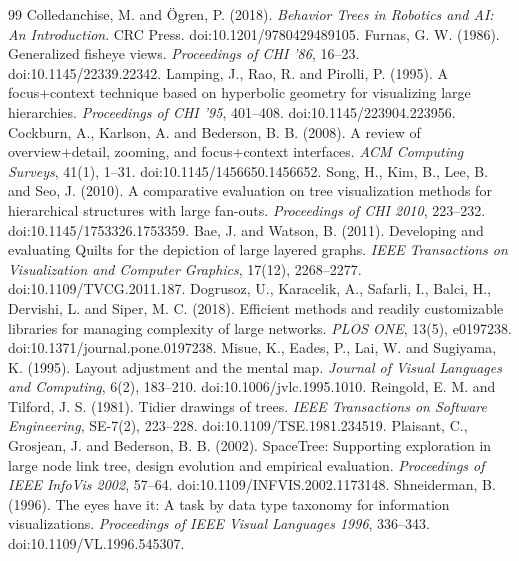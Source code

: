 \begin{thebibliography}{99}
 Colledanchise, M. and Ögren, P. (2018). \emph{Behavior Trees in Robotics and AI: An Introduction}. CRC Press. doi:10.1201/9780429489105.
 Furnas, G. W. (1986). Generalized fisheye views. \emph{Proceedings of CHI '86}, 16--23. doi:10.1145/22339.22342.
 Lamping, J., Rao, R. and Pirolli, P. (1995). A focus+context technique based on hyperbolic geometry for visualizing large hierarchies. \emph{Proceedings of CHI '95}, 401--408. doi:10.1145/223904.223956.
 Cockburn, A., Karlson, A. and Bederson, B. B. (2008). A review of overview+detail, zooming, and focus+context interfaces. \emph{ACM Computing Surveys}, 41(1), 1--31. doi:10.1145/1456650.1456652.
 Song, H., Kim, B., Lee, B. and Seo, J. (2010). A comparative evaluation on tree visualization methods for hierarchical structures with large fan-outs. \emph{Proceedings of CHI 2010}, 223--232. doi:10.1145/1753326.1753359.
 Bae, J. and Watson, B. (2011). Developing and evaluating Quilts for the depiction of large layered graphs. \emph{IEEE Transactions on Visualization and Computer Graphics}, 17(12), 2268--2277. doi:10.1109/TVCG.2011.187.
 Dogrusoz, U., Karacelik, A., Safarli, I., Balci, H., Dervishi, L. and Siper, M. C. (2018). Efficient methods and readily customizable libraries for managing complexity of large networks. \emph{PLOS ONE}, 13(5), e0197238. doi:10.1371/journal.pone.0197238.
 Misue, K., Eades, P., Lai, W. and Sugiyama, K. (1995). Layout adjustment and the mental map. \emph{Journal of Visual Languages and Computing}, 6(2), 183--210. doi:10.1006/jvlc.1995.1010.
 Reingold, E. M. and Tilford, J. S. (1981). Tidier drawings of trees. \emph{IEEE Transactions on Software Engineering}, SE-7(2), 223--228. doi:10.1109/TSE.1981.234519.
 Plaisant, C., Grosjean, J. and Bederson, B. B. (2002). SpaceTree: Supporting exploration in large node link tree, design evolution and empirical evaluation. \emph{Proceedings of IEEE InfoVis 2002}, 57--64. doi:10.1109/INFVIS.2002.1173148.
 Shneiderman, B. (1996). The eyes have it: A task by data type taxonomy for information visualizations. \emph{Proceedings of IEEE Visual Languages 1996}, 336--343. doi:10.1109/VL.1996.545307.

\end{thebibliography}
